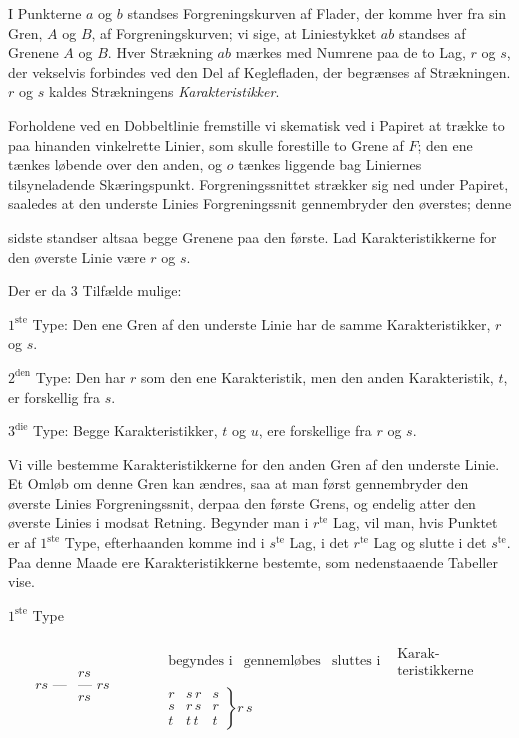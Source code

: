 \documentclass{article}
\begin{document}
I Punkterne $a$ og $b$ standses Forgreningskurven af Flader, der komme hver fra sin Gren, $A$ og $B$, af Forgreningskurven; vi sige, at Liniestykket $ab$ standses af Grenene $A$ og $B$. Hver Strækning $ab$ mærkes med Numrene paa de to Lag, $r$ og $s$, der vekselvis forbindes ved den Del af Keglefladen, der begrænses af Strækningen. $r$ og $s$ kaldes Strækningens \emph{Karakteristikker}.

Forholdene ved en Dobbeltlinie fremstille vi skematisk ved i Papiret at trække to paa hinanden vinkelrette Linier, som skulle forestille to Grene af $F$; den ene tænkes løbende over den anden, og $o$ tænkes liggende bag Liniernes tilsyneladende Skæringspunkt. Forgreningssnittet strækker sig ned under Papiret, saaledes at den underste Linies Forgreningssnit gennembryder den øverstes; denne

sidste standser altsaa begge Grenene paa den første. Lad Karakteristikkerne for den øverste Linie være $r$ og $s$.

Der er da 3 Tilfælde mulige:

$1^{\text{ste}}$ Type: Den ene Gren af den underste Linie har de samme Karakteristikker, $r$ og $s$.

$2^{\text{den}}$ Type: Den har $r$ som den ene Karakteristik, men den anden Karakteristik, $t$, er forskellig fra $s$.

$3^{\text{die}}$ Type: Begge Karakteristikker, $t$ og $u$, ere forskellige fra $r$ og $s$.

Vi ville bestemme Karakteristikkerne for den anden Gren af den underste Linie. Et Omløb om denne Gren kan ændres, saa at man først gennembryder den øverste Linies Forgreningssnit, derpaa den første Grens, og endelig atter den øverste Linies i modsat Retning. Begynder man i $r^{\text{te}}$ Lag, vil man, hvis Punktet er af $1^{\text{ste}}$ Type, efterhaanden komme ind i $s^{\text{te}}$ Lag, i det $r^{\text{te}}$ Lag og slutte i det $s^{\text{te}}$. Paa denne Maade ere Karakteristikkerne bestemte, som nedenstaaende Tabeller vise.

\begin{center}
$1^{\text{ste}}$ Type
\end{center}
\[
\begin{array}{c|c}
& rs \\
rs\text{ ---} & \text{--- } rs \\
& rs
\end{array}
\qquad\quad
\begin{array}{c}
\begin{array}{cccc}
\text{begyndes i} & \text{gennemløbes} & \text{sluttes i} & \begin{array}{c}\text{Karak-}\\\text{teristikkerne}\end{array}
\end{array} \\
\left.
\begin{array}{ccc}
r & s\,r & s \\
s & r\,s & r \\
t & t\,t & t
\end{array}
\right\} r\,s
\end{array}
\]
\end{document}
